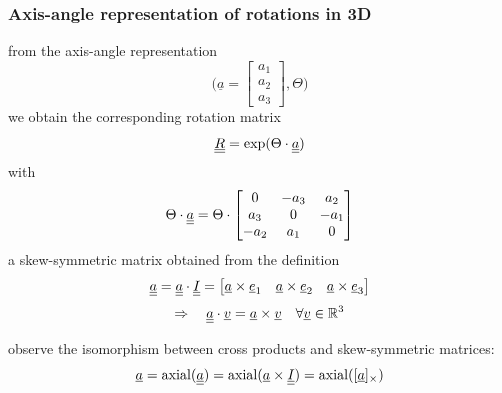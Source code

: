 \begin{frame}
  \frametitle{Axis-angle representation of rotations in 3D}
  
  from the axis-angle representation
  \begin{displaymath}
    \Biggl( \underline{a} =
    \begin{bmatrix}
      a_1 \\ a_2 \\ a_3
    \end{bmatrix}, \Theta \Biggr)
  \end{displaymath}
  we obtain the corresponding rotation matrix
  \begin{displaymath}
    \underline{\underline{R}} = \exp(\Theta \cdot \underline{\underline{a}})  
  \end{displaymath}
  with
  \begin{displaymath}
    \Theta \cdot \underline{\underline{a}} = \Theta \cdot 
    \begin{bmatrix}
      0 & -a_3 & a_2 \\
      a_3 & 0 & -a_1 \\
      -a_2 & a_1 & 0
    \end{bmatrix}
  \end{displaymath}
  a skew-symmetric matrix obtained from the definition
  \begin{displaymath}
    \underline{\underline{a}} = \underline{\underline{a}} \cdot \underline{\underline{I}} =
    \begin{bmatrix}
      \underline{a} \times \underline{e}_1 & \underline{a} \times \underline{e}_2 & \underline{a} \times \underline{e}_3
    \end{bmatrix}
  \end{displaymath}
  \begin{displaymath}
    \Rightarrow \quad
    \underline{\underline{a}} \cdot \underline{v} = \underline{a} \times \underline{v} \quad \forall \underline{v} \in \mathbb{R}^3
  \end{displaymath}
  
  \vspace{0.5em}
  observe the isomorphism between cross products and skew-symmetric matrices:
  \begin{displaymath}
    \underline{a} = \mathrm{axial}(\underline{\underline{a}}) = \mathrm{axial}(\underline{a} \times \underline{\underline{I}}) = \mathrm{axial}([\underline{a}]_{\times})
  \end{displaymath}
\end{frame}


